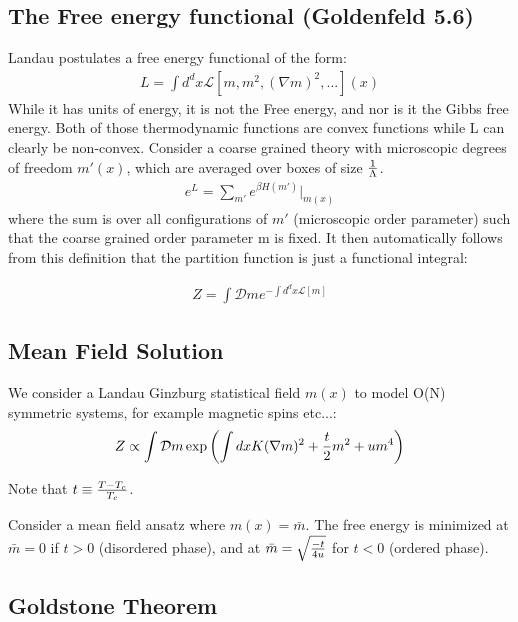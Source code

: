 \documentclass[11pt]{scrartcl}
\begin{document}
\subsection{The Free energy functional (Goldenfeld 5.6)}

Landau postulates a free energy functional of the form:
\begin{align}
L = \int d^d x \mathcal{L}[m, m^2, (\nabla m)^2, ...](x)
\end{align}
While it has units of energy, it is not the Free energy, and nor is it the Gibbs free energy.  Both of those
thermodynamic functions are convex functions while L can clearly be non-convex.
Consider a coarse grained theory with microscopic degrees of freedom $m'(x)$, which are averaged over boxes of size ${1 \over \Lambda}$.
\begin{align}
e^{L} = \sum_{m'} e^{\beta H(m')} |_{m(x)}
\end{align}
where the sum is over all configurations of $m'$ (microscopic order parameter) such that the coarse grained order parameter m is fixed.
It then automatically follows from this definition that the partition function is just a functional integral:

\begin{align}
\boxed{Z = \int \mathcal{D}m e^{- \int d^d x \mathcal{L}[m]}}
\end{align}


\subsection{Mean Field Solution}

We consider a Landau Ginzburg statistical field $m(x)$ to model O(N) symmetric systems, for example magnetic spins etc...:
\begin{align}
Z \propto \int \mathcal{D}m \exp\left( \int dx K (\nabla m)^2 + {t \over 2} m^2 + u m^4 \right)
\end{align}

Note that $t \equiv {T- T_c \over T_c}$.

Consider a mean field ansatz where $m(x) = \bar{m}$.  The free energy is minimized at $\bar{m} = 0$
if $ t > 0 $ (disordered phase), and at $\bar{m} = \sqrt{-t \over 4 u}$ for $t < 0$ (ordered phase).

\subsection{Goldstone Theorem}
\end{document}
